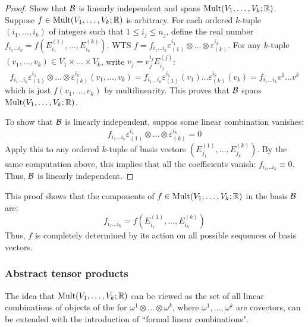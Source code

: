 \begin{proofbox}
  \begin{proof}
    Show that $ \mathcal{B} $ is linearly independent and spans $ \operatorname{Mult}(V_1 , \dots , V_k ; \mathbb{R}) $. Suppose $ f \in \operatorname{Mult}(V_1 , \dots , V_k ; \mathbb{R}) $ is arbitrary. For each ordered $ k $-tuple $ (i_1 , \dots , i_k) $ of integers such that $ 1 \leq i_j \leq n_j $, define the real number $ f_{i_1 \dots i_k} = f(E_{i_1}^{(1)} , \dots , E_{i_k}^{(k)}) $. WTS $ f = f_{i_1 \dots i_k} \varepsilon_{(1)}^{i_1} \otimes \dots \otimes \varepsilon_{(k)}^{i_k} $.
    For any $ k $-tuple $ (v_1 , \dots , v_k) \in V_1 \times \dots \times V_k $, write $ v_j = v_j^{i_j} E_{i_j}^{(j)} $:
    \begin{equation*}
      f_{i_1 \dots i_k} \varepsilon_{(1)}^{i_1} \otimes \dots \otimes \varepsilon_{(k)}^{i_k}(v_1 , \dots , v_k) = f_{i_1 \dots i_k} \varepsilon_{(1)}^{i_1}(v_1) \dots \varepsilon_{(k)}^{i_k}(v_k) = f_{i_1 \dots i_k} v^1 \dots v^k
    \end{equation*}
    which is just $ f(v_1 , \dots , v_k) $ by multilinearity. This proves that $ \mathcal{B} $ spans $ \operatorname{Mult}(V_1 , \dots , V_k ; \mathbb{R}) $.

    To show that $ \mathcal{B} $ is linearly independent, suppos some linear combination vanishes:
    \begin{equation*}
      f_{i_1 \dots i_k} \varepsilon_{(1)}^{i_1} \otimes \dots \otimes \varepsilon_{(k)}^{i_k} = 0
    \end{equation*}
    Apply this to any ordered $ k $-tuple of basis vectors $ (E_{j_1}^{(1)} , \dots , E_{j_k}^{(k)}) $. By the same computation above, this implies that all the coefficients vanish: $ f_{i_1 \dots i_k} \equiv 0 $. Thus, $ \mathcal{B} $ is linearly independent.
  \end{proof}
\end{proofbox}

This proof shows that the components of $ f \in \operatorname{Mult}(V_1 , \dots , V_k ; \mathbb{R}) $ in the basis $ \mathcal{B} $ are:
\begin{equation}
  f_{i_1 \dots i_k} = f(E_{i_1}^{(1)} , \dots , E_{i_k}^{(k)})
\end{equation}
Thus, $ f $ is completely determined by its action on all possible sequences of basis vectors.

\subsubsection{Abstract tensor products}

The idea that $ \operatorname{Mult}(V_1 , \dots , V_k ; \mathbb{R}) $ can be viewed as the set of all linear combinations of objects of the for $ \omega^1 \otimes \dots \otimes \omega^k $, where $ \omega^1 , \dots , \omega^k $ are covectors, can be extended with the introduction of ``formal linear combinations".

